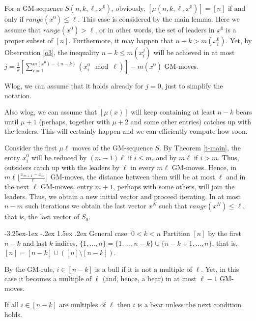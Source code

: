 \documentclass[10pt]{article}
\makeatletter
\renewcommand\subsection{\@startsection{subsection}{2}{\z@}
{-3.25ex\@plus -1ex \@minus -.2ex}
{1.5ex \@plus .2ex}
{\normalfont\normalsize\bfseries\boldmath}}
\theoremstyle{definition}
\makeatother
\begin{document}
For a GM-sequence $S(n,k,\ell,x^0)$,  
obviously, $[\mu(n,k,\ell,x^0)] = [n]$  
if and only if  $range(x^0) \leq \ell$. 
This case is considered by the main lemma.  
Here we assume that $range(x^0) > \ell$, 
or in other words, the set of leaders in $x^0$ 
is a proper subset of $[n]$.  
Furthermore, it may happen that  $n-k > m(x_i^0)$. 
Yet, by Observation \ref{o3}, the inequality  
$n-k \leq m(x_i^j)$  will be achieved in at most 
$j = \frac{1}{k}[\sum_{i=1}^{m(x^0)-(n-k)}(x_i^0 \mod \ell)]-m(x^0)$  
GM-moves. 

Wlog, we can assume that it  
holds already for $j=0$, just to simplify the notation.  

Also wlog, we can assume that 
$[\mu(x)]$  will keep containing at least  $n-k$  bears  
until  $\mu+1$
(perhaps, together with $\mu+2$ and some other entries) 
catches up with the leaders. 
This will certainly happen and we can efficiently compute how soon. 

Consider the first $\mu \ell$ moves 
of the GM-sequence  $S$. %
By Theorem \ref{t-main},   
the entry $x^0_i$ will be reduced 
by  $(m -1) \ell$ if $i \leq m$,  
and by  $m \ell$ if  $i > m$. 
Thus, outsiders catch up with the leaders 
by  $\ell$  in every $m \ell$ GM-moves. 
Hence, in $m \ell \lfloor \frac{x_{m+1} - x_m}{\ell} \rfloor$  
GM-moves, the distance between them will be at most  $\ell$ 
and  in the next $\ell$ GM-moves, entry 
$m+1$, perhaps with some others, will join the leaders. 
Thus, we obtain a new initial vector and proceed iterating. 
In at most $n - m$  such iterations 
we obtain the last vector $x^N$  
such that $range(x^N) \leq \ell$, 
that is, the last vector of $S_0$. 

\subsection{General case: $0 < k < n$}
\label{ss-rs} 
Partition $[n]$  
by the first $n-k$ and last $k$ indices, 
$\{1, \dots, n\} = 
\{1, \dots, n-k\} \cup \{n-k+1, \dots, n\}$,  
that is, 
$[n] = [n-k] \cup ([n] \setminus [n-k])$.

By the GM-rule, 
$i \in [n-k]$   is a bull 
if it is not a multiple of $\ell$. 
Yet, in this case it becomes a
multiple of $\ell$ 
(and, hence, a bear) 
in at most $\ell-1$  GM-moves. 

If all $i \in [n-k]$ are multiples of $\ell$  
then  $i$ is a bear 
unless the next condition holds. 
\end{document}
